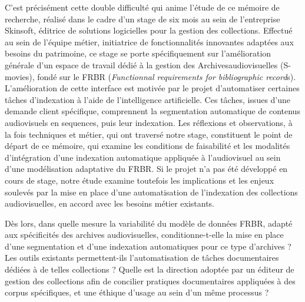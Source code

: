 C'est précisément cette double difficulté qui anime l'étude de ce mémoire de recherche, réalisé dans le cadre d'un stage de six mois au sein de l'entreprise Skinsoft, éditrice de solutions logicielles pour la gestion des collections. Effectué au sein de l'équipe métier, initiatrice de fonctionnalités innovantes adaptées aux besoins du patrimoine, ce stage se porte spécifiquement sur l'amélioration générale d'un espace de travail dédié à la gestion des \gls{Archivesaudiovisuelles} (S-movies), fondé sur le \gls{FRBR} (\textit{Functionnal requirements for bibliographic record}s). L'amélioration de cette interface est motivée par le projet d'automatiser certaines tâches d'indexation à l'aide de l'intelligence artificielle. Ces tâches, issues d'une demande client spécifique, comprennent la segmentation automatique de contenus audiovisuels en \gls{sequence}s, puis leur indexation. Les réflexions et observations, à la fois techniques et métier, qui ont traversé notre stage, constituent le point de départ de ce mémoire, qui examine les conditions de faisabilité et les modalités d'intégration d'une indexation automatique appliquée à l'audiovisuel au sein d'une modélisation adaptative du \gls{FRBR}. Si le projet n'a pas été développé en cours de stage, notre étude examine toutefois les implications et les enjeux soulevés par la mise en place d'une automatisation de l'indexation des collections audiovisuelles, en accord avec les besoins métier existants.

Dès lors, dans quelle mesure la variabilité du modèle de données FRBR, adapté aux spécificités des archives audiovisuelles, conditionne-t-elle la mise en place d'une segmentation et d'une indexation automatiques pour ce type d'archives ? Les outils existants permettent-ils l'automatisation de tâches documentaires dédiées à de telles collections ? Quelle est la direction adoptée par un éditeur de gestion des collections afin de concilier pratiques documentaires appliquées à des corpus spécifiques, et une éthique d'usage au sein d'un même processus ?

